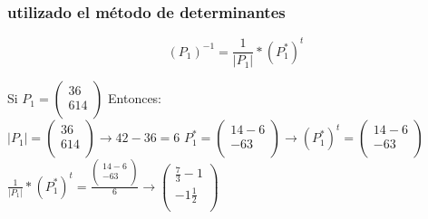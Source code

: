 \documentclass[
	11pt, %
]{beamer}
\begin{document}
\begin{frame}
  \frametitle{utilizado el método de determinantes}

  \[(P_{1})^{-1} = \frac{1}{|P_{1}|}*(P_{1}^{*})^{t}\]

  Si $P_{1} = \begin{pmatrix}
    3 6\\
    6 14\\
  \end{pmatrix}$ Entonces:\\
  $|P_{1}|= \begin{pmatrix}
    3 6\\
    6 14\\
  \end{pmatrix} \rightarrow 42-36=6$
  $P_{1}^{*} = \begin{pmatrix}
    14 -6\\
    -6  3\\
  \end{pmatrix} \rightarrow (P_{1}^{*})^{t} = \begin{pmatrix}
    14 -6\\
    -6  3\\
    \end{pmatrix}$
  $\frac{1}{|P_{1}|}*(P_{1}^{*})^{t} = \frac{\begin{pmatrix} 14 -6\\-6 3\\ \end{pmatrix}}{6} \rightarrow \begin{pmatrix} \frac{7}{3} -1\\
    -1 \frac{1}{2}\\
  \end{pmatrix}$ 
\end{frame}
\end{document}

